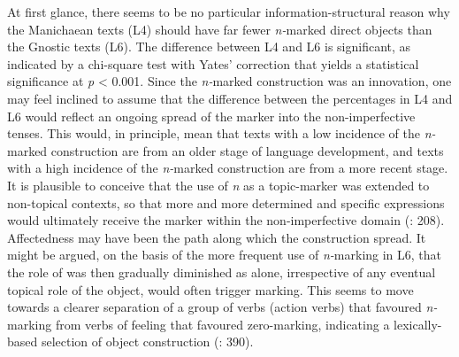 \documentclass[output=paper]{LSP/langsci}
\begin{document}
At first glance, there seems to be no particular information-structural reason why the Manichaean texts (L4) should have far fewer \textit{n-}marked direct objects than the Gnostic texts (L6). The difference between L4 and L6 is significant, as indicated by a chi-square test with Yates’ correction that yields a statistical significance at \textit{p} < 0.001. Since the \textit{n-}marked construction was an innovation, one may feel inclined to assume that the difference between the percentages in L4 and L6 would reflect an ongoing spread of the marker into the non-imperfective tenses. This would, in principle, mean that texts with a low incidence of the \textit{n-}marked construction are from an older stage of language development, and texts with a high incidence of the \textit{n-}marked construction are from a more recent stage. It is plausible to conceive that the use of \textit{n} as a topic-marker was extended to non-topical contexts, so that more and more determined and specific expressions would ultimately receive the marker within the non-imperfective domain (\cf \citealt{Dalrympleetal2011Objects}: 208). Affectedness may have been the path along which the construction spread. It might be argued, on the basis of the more frequent use of \textit{n-}marking in L6, that the role of  was then gradually diminished as  alone, irrespective of any eventual topical role of the object, would often trigger marking. This seems to move towards a clearer separation of a group of verbs (action verbs) that favoured \textit{n-}marking from verbs of feeling that favoured zero-marking, indicating a lexically-based selection of object construction (\cf \citealt{Iemmolo2013Symmetric}: 390). 
\end{document}
